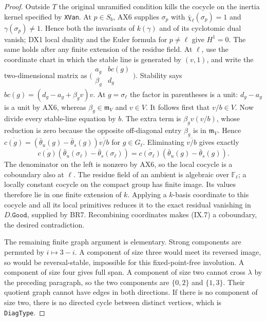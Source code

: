 \begin{proof}
Outside $T$ the original unramified condition kills the
cocycle on the inertia kernel specified by \texttt{XVan}.
At $p\in S_b$, AX6 supplies $\sigma_p$ with
$\bar\chi_\ell(\sigma_p)=1$ and
$\gamma(\sigma_p)\ne1$.  Hence both the invariants of
$k(\gamma)$ and of its cyclotomic dual vanish; DX1 local
duality and the Euler formula for $p\ne\ell$ give $H^1=0$.
The same holds after any finite extension of the residue
field.  At $\ell$, use the coordinate chart in which the
stable line is generated by $(v,1)$, and write the
two-dimensional matrix as
$\bigl(\begin{smallmatrix}a_g&bc(g)\\ \beta_g&d_g\end{smallmatrix}\bigr)$.
Stability says
$bc(g)=(d_g-a_g+\beta_gv)v$.
At $g=\sigma_\ell$ the factor in parentheses is a unit:
$d_g-a_g$ is a unit by AX6, whereas
$\beta_g\in\mathfrak m_V$ and $v\in V$.
It follows first that $v/b\in V$.
Now divide every stable-line equation by $b$.
The extra term is $\beta_gv(v/b)$, whose reduction is
zero because the opposite off-diagonal entry $\beta_g$
is in $\mathfrak m_V$.  Hence
$\overline{c(g)}=(\bar\theta_u(g)-\bar\theta_s(g))
\overline{v/b}$ for $g\in G_\ell$.
Eliminating $\overline{v/b}$ gives exactly
\[
 \overline{c(g)}(\bar\theta_u(\sigma_\ell)
                         -\bar\theta_s(\sigma_\ell))
 =\overline{c(\sigma_\ell)}(\bar\theta_u(g)
                         -\bar\theta_s(g)).
 \tag{IX.8}
\]
The denominator on the left is nonzero by AX6, so the local
cocycle is a coboundary also at $\ell$.
The residue field of an ambient is algebraic over
$\mathbb F_\ell$; a locally constant cocycle on the compact
group has finite image.  Its values therefore lie in one
finite extension of $k$.  Applying a $k$-basis coordinate
to this cocycle and all its local primitives reduces it to
the exact residual vanishing in $D.\texttt{Good}$, supplied
by BR7.  Recombining coordinates makes (IX.7) a coboundary,
the desired contradiction.

The remaining finite graph argument is elementary.
Strong components are permuted by $i\mapsto3-i$.
A component of size three would meet its reversed image,
so would be reversal-stable, impossible for this
fixed-point-free involution.  A component of size four
gives full span.  A component of size two cannot cross
$\lambda$ by the preceding paragraph, so the two components
are $\{0,2\}$ and $\{1,3\}$.  Their quotient graph cannot
have edges in both directions.  If there is no component
of size two, there is no directed cycle between distinct
vertices, which is \texttt{DiagType}.


\end{proof}
